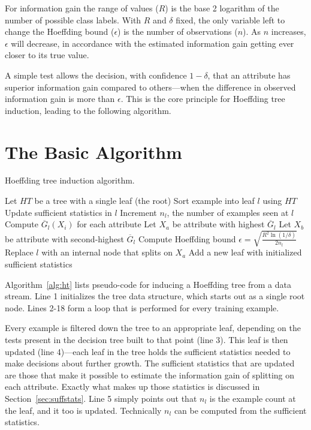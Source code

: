For information gain the range of values ($R$) is the base 2 logarithm of the number of possible class labels. With $R$ and $\delta$ fixed, the only variable left to change the Hoeffding bound ($\epsilon$) is the number of observations ($n$). As $n$ increases, $\epsilon$ will decrease, in accordance with the estimated information gain getting ever closer to its true value.

A simple test allows the decision, with confidence $1 - \delta$, that an attribute has superior information gain compared to others---when the difference in observed information gain is more than $\epsilon$. This is the core principle for Hoeffding tree induction, leading to the following algorithm.

\section{The Basic Algorithm}
\label{sec:basicalgorithm}

\begin{algorithm}
\caption{Hoeffding tree induction algorithm.}
\begin{algorithmic}[1]
\STATE Let $HT$ be a tree with a single leaf (the root)
\STATE Sort example into leaf $l$ using $HT$
\STATE Update sufficient statistics in $l$
\STATE Increment $n_l$, the number of examples seen at $l$
\STATE Compute $\overline{G}_{l}(X_{i})$ for each attribute
\STATE Let $X_{a}$ be attribute with highest $\overline{G}_{l}$
\STATE Let $X_{b}$ be attribute with second-highest $\overline{G}_{l}$
\STATE Compute Hoeffding bound $\epsilon = \sqrt{\frac{R^{2}\ln(1/\delta)}{2n_{l}}}$
\STATE Replace $l$ with an internal node that splits on $X_{a}$
\STATE Add a new leaf with initialized sufficient statistics
\ENDFOR
\ENDIF
\ENDIF
\ENDFOR
\end{algorithmic}
\label{alg:ht}
\end{algorithm}

Algorithm~\ref{alg:ht} lists pseudo-code for inducing a Hoeffding tree from a data stream.
Line 1 initializes the tree data structure, which starts out as a single root node. Lines 2-18 form a loop that is performed for every training example.

Every example is filtered down the tree to an appropriate leaf, depending on the tests present in the decision tree built to that point (line 3). This leaf is then updated (line 4)---each leaf in the tree holds the sufficient statistics needed to make decisions about further growth. The sufficient statistics that are updated are those that make it possible to estimate the information gain of splitting on each attribute. Exactly what makes up those statistics is discussed in Section~\ref{sec:suffstats}.
Line 5 simply points out that $n_l$ is the example count at the leaf, and it too is updated. Technically $n_l$ can be computed from the sufficient statistics.

